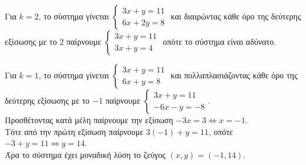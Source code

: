 \begin{alist}
\item Για $k = 2$, το σύστημα γίνεται $\begin{cases} 3x + y = 11 \\ 6x + 2y = 8 \end{cases}$ και διαιρώντας κάθε όρο της δεύτερης εξίσωσης με το 2 παίρνουμε $\begin{cases} 3x + y = 11 \\ 3x + y = 4 \end{cases}$ οπότε το σύστημα είναι αδύνατο.
\item Για $k = 1$, το σύστημα γίνεται $\begin{cases} 3x + y = 11 \\ 6x + y = 8 \end{cases}$ και πολλαπλασιάζοντας κάθε όρο της δεύτερης εξίσωσης με το $-1$ παίρνουμε $\begin{cases} 3x + y = 11 \\ -6x - y = -8 \end{cases}$. \\
Προσθέτοντας κατά μέλη παίρνουμε την εξίσωση $-3x = 3 \Leftrightarrow x = -1$. \\
Τότε από την πρώτη εξίσωση παίρνουμε $3(-1) + y = 11$, οπότε $-3 + y = 11 \Leftrightarrow y = 14$. \\
Άρα το σύστημα έχει μοναδική λύση το ζεύγος $(x, y) = (-1, 14)$.
\end{alist}

